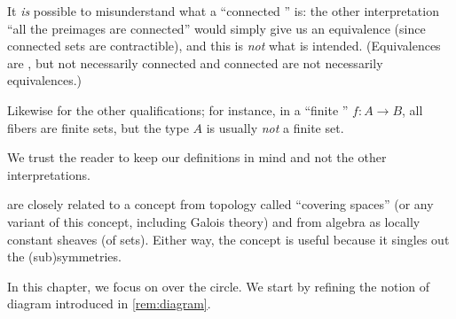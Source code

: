 \begin{remark}
  It \emph{is} possible to misunderstand what a ``connected \covering'' is:
the other interpretation ``all the preimages are connected''
would simply give us an equivalence (since connected sets are contractible),
and this is \emph{not} what is intended. (Equivalences are \coverings,
but not necessarily connected \coverings and connected \coverings are not necessarily equivalences.)

Likewise for the other qualifications; for instance, in a ``finite \covering'' $f:A\to B$,
all fibers are finite sets, but
the type $A$ is usually \emph{not} a finite set.

We trust the reader to keep our definitions in mind and not the other interpretations.
\end{remark}


\begin{remark}
  \Coverings are closely related to a concept from topology called ``covering spaces''
(or any variant of this concept, including Galois theory) and from algebra as locally constant sheaves (of sets).
Either way, the concept is useful because it singles out the (sub)symmetries.
\end{remark}

In this chapter, we focus on \coverings over the circle.
We start by refining the notion of diagram introduced in
\cref{rem:diagram}.

